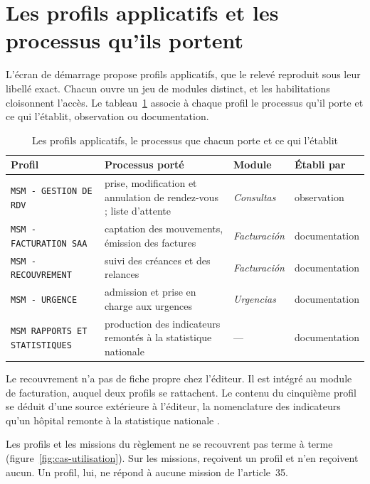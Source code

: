 \section{Les  profils applicatifs et les processus qu'ils portent}

L'écran de démarrage propose  profils applicatifs, que le relevé reproduit sous leur libellé
exact. Chacun ouvre un jeu de modules distinct, et les habilitations
cloisonnent l'accès. Le tableau~\ref{tab:profils-applicatifs} associe à chaque profil le processus
qu'il porte et ce qui l'établit, observation ou documentation.

\begin{table}[htbp]
\centering
\caption{Les  profils applicatifs, le processus que chacun porte et ce qui l'établit}\label{tab:profils-applicatifs}
\begin{tabular}{@{}p{4.3cm}p{4.0cm}p{2.9cm}p{2.9cm}@{}}
\toprule
Profil & Processus porté & Module & Établi par \\
\midrule
\texttt{MSM - GESTION DE RDV} & prise, modification et annulation de rendez-vous ; liste d'attente & \emph{Consultas} \cite{s08} & observation \\
\addlinespace
\texttt{MSM - FACTURATION SAA} & captation des mouvements, émission des factures & \emph{Facturación} \cite{s09} & documentation \\
\addlinespace
\texttt{MSM - RECOUVREMENT} & suivi des créances et des relances & \emph{Facturación} \cite{s09} & documentation \\
\addlinespace
\texttt{MSM - URGENCE} & admission et prise en charge aux urgences & \emph{Urgencias} & documentation \\
\addlinespace
\texttt{MSM RAPPORTS ET STATISTIQUES} & production des indicateurs remontés à la statistique nationale & — \cite{s10} & documentation \\
\bottomrule
\end{tabular}
\end{table}

\medskip

Le recouvrement n'a pas de fiche propre chez l'éditeur. Il est intégré au module de facturation,
auquel deux profils se rattachent. Le contenu du cinquième profil se déduit d'une source extérieure
à l'éditeur, la nomenclature des indicateurs qu'un hôpital remonte à la statistique nationale
\cite{s10}.

Les profils et les missions du règlement ne se recouvrent pas terme à terme
(figure~\ref{fig:cas-utilisation}). Sur les  missions,
 reçoivent un profil et  n'en reçoivent
aucun. Un profil, lui, ne répond à aucune mission de l'article~35.

